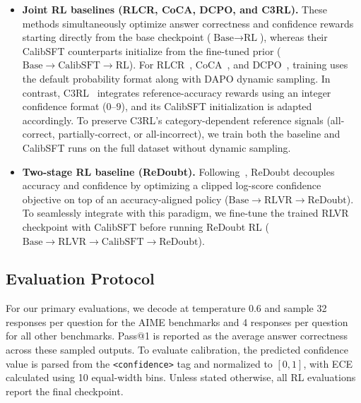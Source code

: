 \documentclass{article} %
\begin{document}
\begin{itemize}[leftmargin=*,itemsep=2pt,topsep=2pt]

    \item \textbf{Joint RL baselines (RLCR, CoCA, DCPO, and C3RL).} 
        These methods simultaneously optimize answer correctness and confidence rewards starting directly from the base checkpoint ($\text{Base} \rightarrow \text{RL}$), whereas their CalibSFT counterparts initialize from the fine-tuned prior ($\text{Base} \rightarrow \text{CalibSFT} \rightarrow \text{RL}$).
        For RLCR~\citep{damani2026beyond}, CoCA~\citep{li2026confidence}, and DCPO~\citep{ma2026decoupling}, training uses the default probability format along with DAPO dynamic sampling.
        In contrast, C3RL~\citep{yang2026scaling} integrates reference-accuracy rewards using an integer confidence format ($0$--$9$), and its CalibSFT initialization is adapted accordingly.
        To preserve C3RL's category-dependent reference signals (all-correct, partially-correct, or all-incorrect), we train both the baseline and CalibSFT runs on the full dataset without dynamic sampling.
        
    \item \textbf{Two-stage RL baseline (ReDoubt).} 
        Following~\citet{bani2026rewarding}, ReDoubt decouples accuracy and confidence by optimizing a clipped log-score confidence objective on top of an accuracy-aligned policy ($\text{Base} \rightarrow \text{RLVR} \rightarrow \text{ReDoubt}$). 
        To seamlessly integrate with this paradigm, we fine-tune the trained RLVR checkpoint with CalibSFT before running ReDoubt RL ($\text{Base} \rightarrow \text{RLVR} \rightarrow \text{CalibSFT} \rightarrow \text{ReDoubt}$).
        
\end{itemize}




\subsection{Evaluation Protocol}
For our primary evaluations, we decode at temperature 0.6 and sample 32 responses per question for the AIME benchmarks and 4 responses per question for all other benchmarks.
Pass@1 is reported as the average answer correctness across these sampled outputs.
To evaluate calibration, the predicted confidence value is parsed from the \texttt{<confidence>} tag and normalized to $[0, 1]$, with ECE calculated using 10 equal-width bins.
Unless stated otherwise, all RL evaluations report the final checkpoint.
\end{document}
